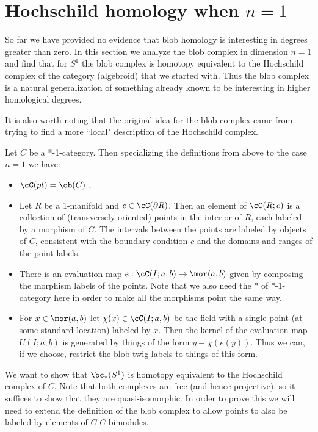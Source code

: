 
\section{Hochschild homology when $n=1$}
\label{sec:hochschild}

So far we have provided no evidence that blob homology is interesting in degrees 
greater than zero.
In this section we analyze the blob complex in dimension $n=1$
and find that for $S^1$ the blob complex is homotopy equivalent to the 
Hochschild complex of the category (algebroid) that we started with.
Thus the blob complex is a natural generalization of something already
known to be interesting in higher homological degrees.

It is also worth noting that the original idea for the blob complex came from trying
to find a more ``local" description of the Hochschild complex.


Let $C$ be a *-1-category.
Then specializing the definitions from above to the case $n=1$ we have:
\begin{itemize}
\item $\cC(pt) = \ob(C)$ .
\item Let $R$ be a 1-manifold and $c \in \cC(\bd R)$.
Then an element of $\cC(R; c)$ is a collection of (transversely oriented)
points in the interior
of $R$, each labeled by a morphism of $C$.
The intervals between the points are labeled by objects of $C$, consistent with
the boundary condition $c$ and the domains and ranges of the point labels.
\item There is an evaluation map $e: \cC(I; a, b) \to \mor(a, b)$ given by
composing the morphism labels of the points.
Note that we also need the * of *-1-category here in order to make all the morphisms point
the same way.
\item For $x \in \mor(a, b)$ let $\chi(x) \in \cC(I; a, b)$ be the field with a single
point (at some standard location) labeled by $x$.
Then the kernel of the evaluation map $U(I; a, b)$ is generated by things of the
form $y - \chi(e(y))$.
Thus we can, if we choose, restrict the blob twig labels to things of this form.
\end{itemize}

We want to show that $\bc_*(S^1)$ is homotopy equivalent to the
Hochschild complex of $C$.
Note that both complexes are free (and hence projective), so it suffices to show that they
are quasi-isomorphic.
In order to prove this we will need to extend the 
definition of the blob complex to allow points to also
be labeled by elements of $C$-$C$-bimodules.

